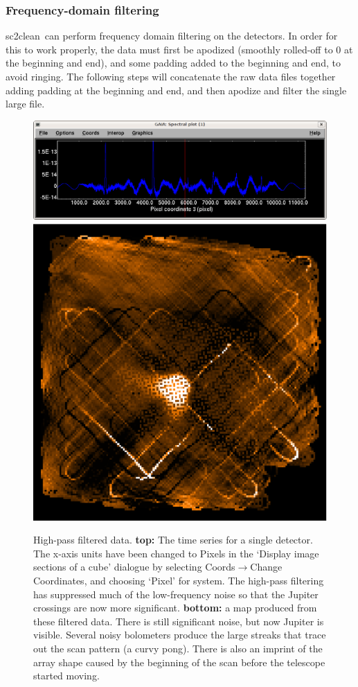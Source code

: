 \documentclass[twoside,11pt]{article}
\newcommand{\task}[1]{\textsf{#1}}
\newcommand{\clean}{\xref{\task{sc2clean}}{sun258}{SC2CLEAN}}
\newcommand{\xref}[3]{#1}
\newcommand{\xlabel}[1]{}
\renewcommand{\_}{\texttt{\symbol{95}}}
\begin{document}
\subsubsection{\xlabel{fftfilter}Frequency-domain filtering} 

\clean\ can perform frequency domain filtering on the detectors. In
order for this to work properly, the data must first be apodized
(smoothly rolled-off to 0 at the beginning and end), and some padding
added to the beginning and end, to avoid ringing. The following steps
will concatenate the raw data files together adding padding at the
beginning and end, and then apodize and filter the single large file.

\begin{figure}
\begin{center}
\includegraphics[width=\linewidth]{spec_filt.eps} \\
\vspace{0.3in}
\includegraphics[width=0.5\linewidth]{map_highpass.eps}
\caption{High-pass filtered data. {\bf top:} The time series for a
  single detector. The x-axis units have been changed to Pixels in the
  `Display image sections of a cube' dialogue by selecting
  Coords$\rightarrow$Change Coordinates, and choosing `Pixel' for
  system. The high-pass filtering has suppressed much of the
  low-frequency noise so that the Jupiter crossings are now more
  significant. {\bf bottom:} a map produced from these filtered
  data. There is still significant noise, but now Jupiter is
  visible. Several noisy bolometers produce the large streaks that
  trace out the scan pattern (a curvy pong). There is also an imprint
  of the array shape caused by the beginning of the scan before the
  telescope started moving.}
\label{fig:highpass}
\end{center}
\end{figure}
\end{document}
